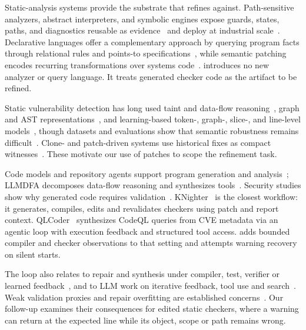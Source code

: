 Static-analysis systems provide the substrate that \toolname refines against.
Path-sensitive analyzers, abstract interpreters, and symbolic engines expose guards, states, paths, and diagnostics reusable as evidence~\cite{engler2001bugs,ball2002slam,cousot2005astree,cadar2008klee} and deploy at industrial scale~\cite{calcagno2015infer,bessey2010coverity,sadowski2015tricorder}.
Declarative languages offer a complementary approach by querying program facts through relational rules and points-to specifications~\cite{avgustinov2016ql,jordan2016souffle,bravenboer2009doop}, while semantic patching encodes recurring transformations over systems code~\cite{padioleau2008coccinelle}.
\toolname introduces no new analyzer or query language.
It treats generated checker code as the artifact to be refined.

Static vulnerability detection has long used taint and data-flow reasoning~\cite{livshits2005finding,jovanovic2006pixy,arzt2014flowdroid}, graph and AST representations~\cite{yamaguchi2014cpg,yamaguchi2012vex}, and learning-based token-, graph-, slice-, and line-level models~\cite{russell2018vulnerability,li2018vuldeepecker,li2021sysevr,fu2022linevul}, though datasets and evaluations show that semantic robustness remains difficult~\cite{fan2020bigvul,chakraborty2021deep}.
Clone- and patch-driven systems use historical fixes as compact witnesses~\cite{jang2012redebug,li2016vulpecker,kim2017vuddy}.
These motivate our use of patches to scope the refinement task.

Code models and repository agents support program generation and analysis~\cite{chen2021codex,guo2025repoaudit}; LLMDFA decomposes data-flow reasoning and synthesizes tools~\cite{wang2024llmdfa}.
Security studies show why generated code requires validation~\cite{pearce2022copilot,perry2023users,khoury2023chatgpt}.
KNighter~\cite{yang2025knighter} is the closest workflow: it generates, compiles, edits and revalidates checkers using patch and report context.
QLCoder~\cite{wang2025qlcoder} synthesizes CodeQL queries from CVE metadata via an agentic loop with execution feedback and structured tool access.
\toolname adds bounded compiler and checker observations to that setting and attempts warning recovery on silent starts.

The loop also relates to repair and synthesis under compiler, test, verifier or learned feedback~\cite{clarke2000cegar,solarlezama2006sketch,legoues2012genprog,kim2013par,long2015spr,nguyen2013semfix,mechtaev2016angelix,long2016prophet}, and to LLM work on iterative feedback, tool use and search~\cite{madaan2023selfrefine,shinn2023reflexion,yao2023react,schick2023toolformer,yao2023tree}.
Weak validation proxies and repair overfitting are established concerns~\cite{qi2015plausibility,smith2015overfitting}.
Our follow-up examines their consequences for edited static checkers, where a warning can return at the expected line while its object, scope or path remains wrong.

